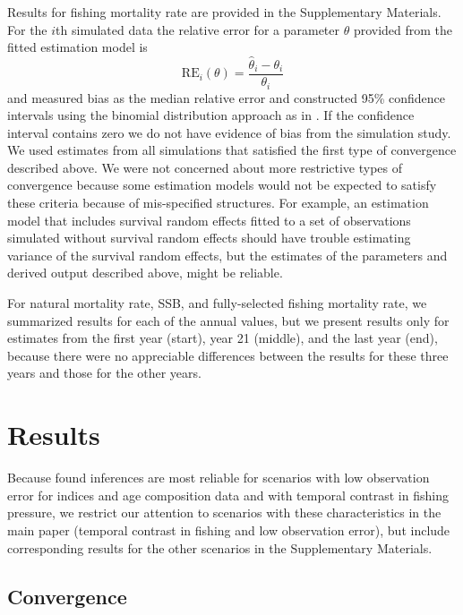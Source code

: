 \documentclass[
  12pt,
]{article}
\begin{document}
Results for fishing mortality rate are provided in the Supplementary Materials. For the \(i\)th simulated data the relative error for a parameter \(\theta\) provided from the fitted estimation model is
\[
{\text{RE}_i}\left(\theta\right) = \frac{\widehat \theta_i - \theta_i}{\theta_i}
\]
and measured bias as the median relative error and constructed 95\% confidence intervals using the binomial distribution approach as in \citet{stockmiller21}. If the confidence interval contains zero we do not have evidence of bias from the simulation study. We used estimates from all simulations that satisfied the first type of convergence described above. We were not concerned about more restrictive types of convergence because some estimation models would not be expected to satisfy these criteria because of mis-specified structures. For example, an estimation model that includes survival random effects fitted to a set of observations simulated without survival random effects should have trouble estimating variance of the survival random effects, but the estimates of the parameters and derived output described above, might be reliable.

For natural mortality rate, SSB, and fully-selected fishing mortality rate, we summarized results for each of the annual values, but we present results only for estimates from the first year (start), year 21 (middle), and the last year (end), because there were no appreciable differences between the results for these three years and those for the other years.

\hypertarget{results}{%
\section*{Results}\label{results}}

Because \citet{milleretal_inreview1} found inferences are most reliable for scenarios with low observation error for indices and age composition data and with temporal contrast in fishing pressure, we restrict our attention to scenarios with these characteristics in the main paper (temporal contrast in fishing and low observation error), but include corresponding results for the other scenarios in the Supplementary Materials.

\hypertarget{convergence-1}{%
\subsection*{Convergence}\label{convergence-1}}
\end{document}
